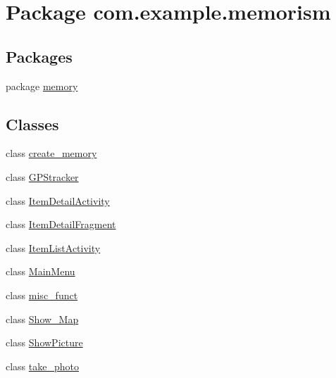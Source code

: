 \hypertarget{namespacecom_1_1example_1_1memorism}{}\section{Package com.\+example.\+memorism}
\label{namespacecom_1_1example_1_1memorism}
\subsection*{Packages}
\begin{DoxyCompactItemize}
\item 
package \hyperlink{namespacecom_1_1example_1_1memorism_1_1memory}{memory}
\end{DoxyCompactItemize}
\subsection*{Classes}
\begin{DoxyCompactItemize}
\item 
class \hyperlink{classcom_1_1example_1_1memorism_1_1create__memory}{create\+\_\+memory}
\item 
class \hyperlink{classcom_1_1example_1_1memorism_1_1_g_p_stracker}{G\+P\+Stracker}
\item 
class \hyperlink{classcom_1_1example_1_1memorism_1_1_item_detail_activity}{Item\+Detail\+Activity}
\item 
class \hyperlink{classcom_1_1example_1_1memorism_1_1_item_detail_fragment}{Item\+Detail\+Fragment}
\item 
class \hyperlink{classcom_1_1example_1_1memorism_1_1_item_list_activity}{Item\+List\+Activity}
\item 
class \hyperlink{classcom_1_1example_1_1memorism_1_1_main_menu}{Main\+Menu}
\item 
class \hyperlink{classcom_1_1example_1_1memorism_1_1misc__funct}{misc\+\_\+funct}
\item 
class \hyperlink{classcom_1_1example_1_1memorism_1_1_show___map}{Show\+\_\+\+Map}
\item 
class \hyperlink{classcom_1_1example_1_1memorism_1_1_show_picture}{Show\+Picture}
\item 
class \hyperlink{classcom_1_1example_1_1memorism_1_1take__photo}{take\+\_\+photo}
\end{DoxyCompactItemize}
